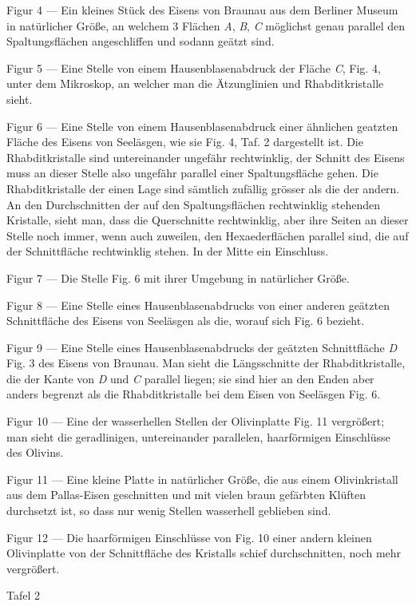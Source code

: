 \documentclass[a4paper, 11pt, oneside]{article}
\begin{document}
Figur 4 — Ein kleines Stück des Eisens von Braunau aus dem Berliner Museum in natürlicher Größe, an welchem 3 Flächen \emph{A}, \emph{B}, \emph{C} möglichst genau parallel den Spaltungsflächen angeschliffen und sodann geätzt sind.

Figur 5 — Eine Stelle von einem Hausenblasenabdruck der Fläche \emph{C}, Fig. 4, unter dem Mikroskop, an welcher man die Ätzunglinien und Rhabditkristalle sieht.

Figur 6 — Eine Stelle von einem Hausenblasenabdruck einer ähnlichen geatzten Fläche des Eisens von Seeläsgen, wie sie Fig. 4, Taf. 2 dargestellt ist. Die Rhabditkristalle sind untereinander ungefähr rechtwinklig, der Schnitt des Eisens muss an dieser Stelle also ungefähr parallel einer Spaltungsfläche gehen. Die Rhabditkristalle der einen Lage sind sämtlich zufällig grösser als die der andern. An den Durchschnitten der auf den Spaltungsflächen rechtwinklig stehenden Kristalle, sieht man, dass die Querschnitte rechtwinklig, aber ihre Seiten an dieser Stelle noch immer, wenn auch zuweilen, den Hexaederflächen parallel sind, die auf der Schnittfläche rechtwinklig stehen. In der Mitte ein Einschluss.

Figur 7 — Die Stelle Fig. 6 mit ihrer Umgebung in natürlicher Größe.

Figur 8 — Eine Stelle eines Hausenblasenabdrucks von einer anderen geätzten Schnittfläche des Eisens von Seeläsgen als die, worauf sich Fig. 6 bezieht.

Figur 9 — Eine Stelle eines Hausenblasenabdrucks der geätzten Schnittfläche \emph{D} Fig. 3 des Eisens von Braunau. Man sieht die Längsschnitte der Rhabditkristalle, die der Kante von \emph{D} und \emph{C} parallel liegen; sie sind hier an den Enden aber anders begrenzt als die Rhabditkristalle bei dem Eisen von Seeläsgen Fig. 6.

Figur 10 — Eine der wasserhellen Stellen der Olivinplatte Fig. 11 vergrößert; man sieht die geradlinigen, untereinander parallelen, haarförmigen Einschlüsse des Olivins.

Figur 11 — Eine kleine Platte in natürlicher Größe, die aus einem Olivinkristall aus dem Pallas-Eisen geschnitten und mit vielen braun gefärbten Klüften durchsetzt ist, so dass nur wenig Stellen wasserhell geblieben sind.

Figur 12 — Die haarförmigen Einschlüsse von Fig. 10 einer andern kleinen Olivinplatte von der Schnittfläche des Kristalls schief durchschnitten, noch mehr vergrößert.

Tafel 2
\end{document}

